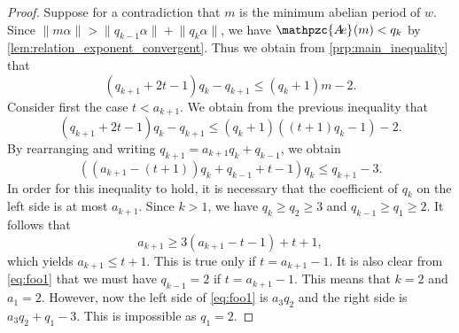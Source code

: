 \documentclass[a4paper,fleqn]{article}
\providecommand{\norm}[1]{\lVert#1\rVert}
\newcommand{\abexp}[2][]{\mathpzc{A\mkern-3mu e}_{#1}(#2)}
\begin{document}
  \begin{proof}
    Suppose for a contradiction that $m$ is the minimum abelian period of $w$. Since
    $\norm{m\alpha} > \norm{q_{k-1}\alpha} + \norm{q_k\alpha}$, we have $\abexp{m} < q_k$ by
    \autoref{lem:relation_exponent_convergent}. Thus we obtain from \autoref{prp:main_inequality} that
    \begin{equation*}
      (q_{k+1} + 2t - 1)q_k - q_{k+1} \leq (q_k + 1)m - 2.
    \end{equation*}
    Consider first the case $t < a_{k+1}$. We obtain from the previous inequality that
    \begin{equation*}
      (q_{k+1} + 2t - 1)q_k - q_{k+1} \leq (q_k + 1)((t + 1)q_k - 1) - 2.
    \end{equation*}
    By rearranging and writing $q_{k+1} = a_{k+1}q_k + q_{k-1}$, we obtain
    \begin{equation}\label{eq:foo1}
      ((a_{k+1} - (t + 1))q_k + q_{k-1} + t - 1)q_k \leq q_{k+1} - 3.
    \end{equation}
    In order for this inequality to hold, it is necessary that the coefficient of $q_k$ on the left side is at most
    $a_{k+1}$. Since $k > 1$, we have $q_k \geq q_2 \geq 3$ and $q_{k-1} \geq q_1 \geq 2$. It follows that
    \begin{equation*}
      a_{k+1} \geq 3(a_{k+1} - t - 1) + t + 1,
    \end{equation*}
    which yields $a_{k+1} \leq t + 1$. This is true only if $t = a_{k+1} - 1$. It is also clear from \eqref{eq:foo1}
    that we must have $q_{k-1} = 2$ if $t = a_{k+1} - 1$. This means that $k = 2$ and $a_1 = 2$. However, now the left
    side of \eqref{eq:foo1} is $a_3 q_2$ and the right side is $a_3 q_2 + q_1 - 3$. This is impossible as $q_1 = 2$.


\end{proof}
\end{document}
